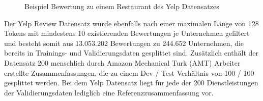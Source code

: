 \begin{figure}[!h]
    \centering
    \scriptsize
    \caption{Beispiel Bewertung zu einem Restaurant des Yelp Datensatzes}
\end{figure}

Der Yelp Review Datensatz wurde ebenfalls nach einer maximalen Länge von 128 Tokens mit mindestens 10 existierenden Bewertungen je Unternehmen gefiltert und besteht somit aus 13.053.202 Bewertungen zu 244.652 Unternehmen, die bereits in Trainings- und Validierungsdaten gesplittet sind. 
Zusätzlich enthält der Datensatz 200 menschlich durch Amazon Mechanical Turk (AMT) Arbeiter erstellte Zusammenfassungen, die zu einem Dev / Test Verhältnis von 100 / 100 gesplittet werden. 
Bei dem Yelp Datensatz liegt für jede der 200 Dienstleistungen der Validierungsdaten lediglich eine Referenzzusammenfassung vor.
\pagebreak
